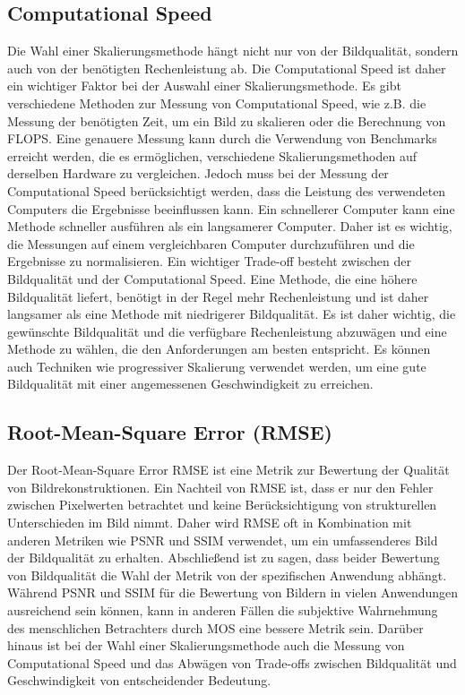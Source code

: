     \subsection{Computational Speed}
    
        Die Wahl einer Skalierungsmethode hängt nicht nur von der Bildqualität, sondern auch von der benötigten Rechenleistung ab. 
        Die Computational Speed ist daher ein wichtiger Faktor bei der Auswahl einer Skalierungsmethode.
        Es gibt verschiedene Methoden zur Messung von Computational Speed, wie z.B. die Messung der benötigten Zeit, um ein Bild zu skalieren oder die Berechnung von \ac{FLOPS}. 
        Eine genauere Messung kann durch die Verwendung von Benchmarks erreicht werden, die es ermöglichen, verschiedene Skalierungsmethoden auf derselben Hardware zu vergleichen.
        Jedoch muss bei der Messung der Computational Speed berücksichtigt werden, dass die Leistung des verwendeten Computers die Ergebnisse beeinflussen kann. 
        Ein schnellerer Computer kann eine Methode schneller ausführen als ein langsamerer Computer. 
        Daher ist es wichtig, die Messungen auf einem vergleichbaren Computer durchzuführen und die Ergebnisse zu normalisieren.
        Ein wichtiger Trade-off besteht zwischen der Bildqualität und der Computational Speed. 
        Eine Methode, die eine höhere Bildqualität liefert, benötigt in der Regel mehr Rechenleistung und ist daher langsamer als eine Methode mit niedrigerer Bildqualität. 
        Es ist daher wichtig, die gewünschte Bildqualität und die verfügbare Rechenleistung abzuwägen und eine Methode zu wählen, die den Anforderungen am besten entspricht. 
        Es können auch Techniken wie progressiver Skalierung verwendet werden, um eine gute Bildqualität mit einer angemessenen Geschwindigkeit zu erreichen.
    \subsection{Root-Mean-Square Error (RMSE)}
    
        Der Root-Mean-Square Error \ac{RMSE} ist eine Metrik zur Bewertung der Qualität von Bildrekonstruktionen. 
        Ein Nachteil von RMSE ist, dass er nur den Fehler zwischen Pixelwerten betrachtet und keine Berücksichtigung von strukturellen Unterschieden im Bild nimmt. 
        Daher wird RMSE oft in Kombination mit anderen Metriken wie PSNR und SSIM verwendet, um ein umfassenderes Bild der Bildqualität zu erhalten.
        Abschließend ist zu sagen, dass beider Bewertung von Bildqualität die Wahl der Metrik von der spezifischen Anwendung abhängt. 
        Während PSNR und SSIM für die Bewertung von Bildern in vielen Anwendungen ausreichend sein können, kann in anderen Fällen die subjektive Wahrnehmung des menschlichen Betrachters durch MOS eine bessere Metrik sein. 
        Darüber hinaus ist bei der Wahl einer Skalierungsmethode auch die Messung von Computational Speed und das Abwägen von Trade-offs zwischen Bildqualität und Geschwindigkeit von entscheidender Bedeutung.
